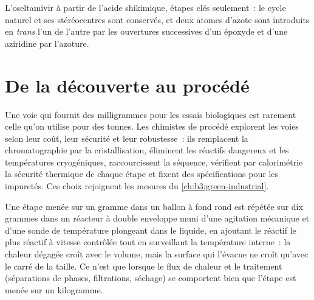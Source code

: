 \begin{omfigure}

{\small L'oseltamivir à partir de l'acide shikimique, étapes clés
seulement~: le cycle naturel et ses stéréocentres sont conservés, et deux
atomes d'azote sont introduits en \textit{trans} l'un de l'autre par les ouvertures
successives d'un époxyde et d'une aziridine par l'azoture.}
\end{omfigure}

\section{De la découverte au procédé}

Une voie qui fournit des milligrammes pour les essais biologiques est
rarement celle qu'on utilise pour des tonnes. Les chimistes de procédé
explorent les voies selon leur coût, leur sécurité et leur robustesse~: ils
remplacent la chromatographie par la cristallisation, éliminent les
réactifs dangereux et les températures cryogéniques, raccourcissent la
séquence, vérifient par calorimétrie la sécurité thermique de chaque étape
et fixent des spécifications pour les impuretés. Ces choix rejoignent les
mesures du \cref{ch:b3:green-industrial}.

\begin{inthelab}
Une étape menée sur un gramme dans un ballon à fond rond est répétée sur
dix grammes dans un réacteur à double enveloppe muni d'une agitation
mécanique et d'une sonde de température plongeant dans le liquide, en
ajoutant le réactif le plus réactif à vitesse contrôlée tout en surveillant la
température interne~: la chaleur dégagée croît avec le volume, mais la
surface qui l'évacue ne croît qu'avec le carré de la taille. Ce n'est que
lorsque le flux de chaleur et le traitement (séparations de phases,
filtrations, séchage) se comportent bien que l'étape est menée sur un
kilogramme.
\end{inthelab}

